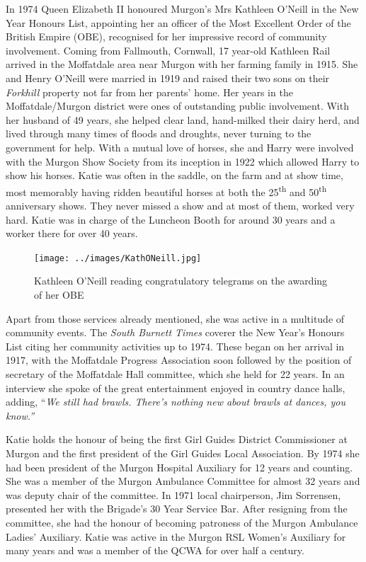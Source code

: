 In 1974 Queen Elizabeth II honoured Murgon's Mrs Kathleen O'Neill in the New Year Honours List, appointing her an officer of the Most Excellent Order of the British Empire (OBE), recognised for her impressive record of community involvement. Coming from Fallmouth, Cornwall, 17 year-old Kathleen Rail arrived in the Moffatdale area near Murgon with her farming family in 1915. She and Henry O'Neill were married in 1919 and raised their two sons on their \emph{Forkhill} property not far from her parents' home. Her years in the Moffatdale/Murgon district were ones of outstanding public involvement. With her husband of 49 years, she helped clear land, hand-milked their dairy herd, and lived through many times of floods and droughts, never turning to the government for help. With a mutual love of horses, she and Harry were involved with the Murgon Show Society from its inception in 1922 which allowed Harry to show his horses. Katie was often in the saddle, on the farm and at show time, most memorably having ridden beautiful horses at both the 25\textsuperscript{th} and 50\textsuperscript{th} anniversary shows. They never missed a show and at most of them, worked very hard. Katie was in charge of the Luncheon Booth for around 30 years and a worker there for over 40 years.









\begin{figure}
\begin{center}
\texttt{[image: ../images/KathONeill.jpg]}
\caption{Kathleen O'Neill reading congratulatory telegrams on the awarding of her OBE}
\end{center}
\end{figure}




Apart from those services already mentioned, she was active in a multitude of community events. The \emph{South Burnett Times} coverer the New Year's Honours List citing her community activities up to 1974. These began on her arrival in 1917, with the Moffatdale Progress Association soon followed by the position of secretary of the Moffatdale Hall committee, which she held for 22 years. In an interview she spoke of the great entertainment enjoyed in country dance halls, adding, ``\emph{We still had brawls. There's nothing new about brawls at dances, you know.''}



Katie holds the honour of being the first Girl Guides District Commissioner at Murgon and the first president of the Girl Guides Local Association. By 1974 she had been president of the Murgon Hospital Auxiliary for 12 years and counting. She was a member of the Murgon Ambulance Committee for almost 32 years and was deputy chair of the committee. In 1971 local chairperson, Jim Sorrensen, presented her with the Brigade's 30 Year Service Bar. After resigning from the committee, she had the honour of becoming patroness of the Murgon Ambulance Ladies' Auxiliary. Katie was active in the Murgon RSL Women's Auxiliary for many years and was a member of the QCWA for over half a century.



